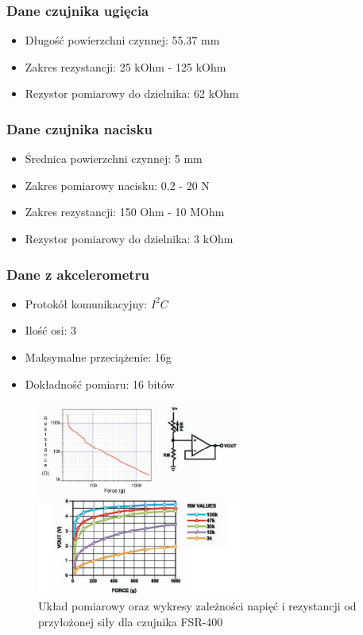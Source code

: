 \documentclass[12pt,a4paper]{article}
\begin{document}
\subsubsection{Dane czujnika ugięcia}
\begin{itemize}
\item Długość powierzchni czynnej: 55.37 mm
\item Zakres rezystancji: 25 kOhm - 125 kOhm
\item Rezystor pomiarowy do dzielnika: 62 kOhm
\end{itemize}
\subsubsection{Dane czujnika nacisku}
\begin{itemize}
\item Średnica powierzchni czynnej: 5 mm
\item Zakres pomiarowy nacisku: 0.2 - 20 N
\item Zakres rezystancji: 150 Ohm - 10 MOhm
\item Rezystor pomiarowy do dzielnika: 3 kOhm
\end{itemize}
\subsubsection{Dane z akcelerometru}
\begin{itemize}
\item Protokół komunikacyjny: $I^2C$
\item Ilość osi: 3
\item Maksymalne przeciążenie: 16g
\item Dokładność pomiaru: 16 bitów 
\end{itemize}

\begin{figure}[h]
\centering
\includegraphics[width=0.6\textwidth]{./fsr-400.jpg}
\caption{Układ pomiarowy oraz wykresy zależności napięć i rezystancji od przyłożonej siły dla czujnika FSR-400}
\end{figure}
\end{document}
